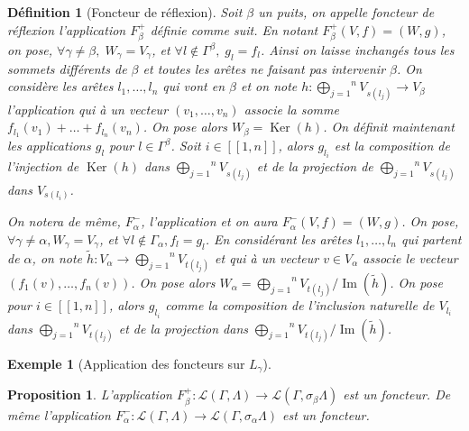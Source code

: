 \documentclass[a4paper,11pt]{article}
\newtheorem{defi}[thm]{Définition}%
\newtheorem{prop}[thm]{Proposition}%
\newtheorem{ex}[thm]{Exemple}%
\DeclareMathOperator{\Ker}{Ker}
\DeclareMathOperator{\Img}{Im}
\begin{document}
\begin{defi}[Foncteur de réflexion]
	Soit $\beta$ un puits, on appelle \emph{foncteur de réflexion} l'application $F_{\beta}^{+}$ définie comme suit. En notant $F_{\beta}^{+}(V,f)=(W,g)$, on pose, $\forall \gamma\neq\beta,\;W_{\gamma}=V_{\gamma}$, et $\forall l \notin \Gamma^{\beta},\; g_{l}=f_{l}$. Ainsi on laisse inchangés tous les sommets différents de $\beta$ et toutes les arêtes ne faisant pas intervenir $\beta$. On considère les arêtes $l_{1},\dots,l_{n}$ qui vont en $\beta$ et on note $h:\overset{n}{\underset{j=1}{\bigoplus}}V_{s(l_{j})}\rightarrow V_{\beta}$ l'application qui à un vecteur $(v_{1},\dots,v_{n})$ associe la somme $f_{l_{1}}(v_{1})+\dots+f_{l_{n}}(v_{n})$. On pose alors $W_{\beta}=\Ker(h)$. On définit maintenant les applications $g_{l}$ pour $l\in\Gamma^{\beta}$. Soit $i\in[\![1,n]\!]$, alors $g_{l_{i}}$ est la composition de l'injection de $\Ker(h)$ dans $\overset{n}{\underset{j=1}{\bigoplus}}V_{s(l_{j})}$ et de la projection de $\overset{n}{\underset{j=1}{\bigoplus}}V_{s(l_{j})}$ dans $V_{s(l_{i})}$. 

	On notera de même, $F^{-}_{\alpha}$, l'application et on aura $F^{-}_{\alpha}(V,f) = (W,g)$. On pose, $\forall \gamma \neq \alpha, W_\gamma = V_\gamma$, et $\forall l \notin \Gamma_\alpha, f_l = g_l$. En considérant les arêtes $l_1, \dots, l_n$ qui partent de $\alpha$, on note $\widetilde{h} : V_\alpha \rightarrow \overset{n}{\underset{j=1}{\bigoplus}}V_{t(l_{j})}$ et qui à un vecteur $v \in V_\alpha$ associe le vecteur $(f_1(v),\dots, f_n(v))$. On pose alors $W_\alpha = \overset{n}{\underset{j=1}{\bigoplus}}V_{t(l_{j})}/\Img(\widetilde{h})$. On pose pour $i\in [\![1,n]\!]$, alors $g_{l_i}$ comme la composition de l'inclusion naturelle de $V_{l_i}$ dans $\overset{n}{\underset{j=1}{\bigoplus}}V_{t(l_{j})}$ et de la projection dans $\overset{n}{\underset{j=1}{\bigoplus}}V_{t(l_{j})}/\Img(\widetilde h)$.

\end{defi}

\begin{ex}[Application des foncteurs sur $L_{\gamma}$]
  
\end{ex}

\begin{prop}
	L'application $F_{\beta}^{+}:\mathscr{L}(\Gamma,\Lambda)\rightarrow\mathscr{L}(\Gamma,\sigma_{\beta}\Lambda)$ est un foncteur. De même l'application $F_{\alpha}^{-}:\mathscr{L}(\Gamma,\Lambda)\rightarrow\mathscr{L}(\Gamma,\sigma_{\alpha}\Lambda)$ est un foncteur.
\end{prop}
\end{document}
